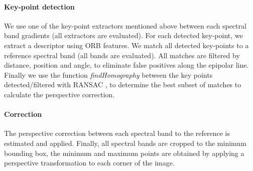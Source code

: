 \documentclass[]{elsarticle}
\begin{document}
	\paragraph{Key-point detection} \label{sec:perspective}
	We use one of the key-point extractors mentioned above between each spectral band gradients (all extractors are evaluated).
	For each detected key-point, we extract a descriptor using ORB features.
	We match all detected key-points to a reference spectral band (all bands are evaluated).
	All matches are filtered by distance, position and angle, to eliminate false positives along the epipolar line.
	Finally we use the function \textit{findHomography} between the key points detected/filtered with RANSAC \cite{Fischler:1981:RSC:358669.358692},
	to determine the best subset of matches to calculate the perspective correction.
	
	
	\paragraph{Correction}
	
	The perspective correction between each spectral band to the reference is estimated and applied.
	Finally, all spectral bands are cropped to the minimum bounding box,
	the minimum and maximum points are obtained by applying a perspective transformation to each corner of the image.
	
	
\end{document}
